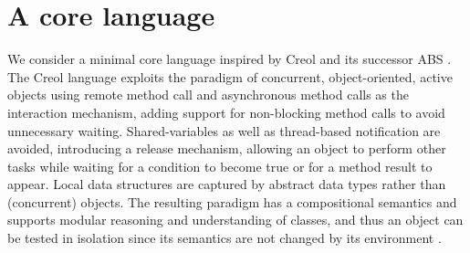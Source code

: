 \documentclass[12pt]{article}%
\begin{document}
\section{A core language}

We consider a minimal core language inspired by Creol and its
successor ABS
\cite{Johnsen04b,johnsen07sosym,Johnsen05d,HATS1.2}. %
The Creol language
exploits the paradigm of concurrent, object-oriented,  active objects
using remote method call and  asynchronous method calls as the interaction
mechanism, adding support for non-blocking method calls to avoid
unnecessary waiting.  Shared-variables as well as 
 thread-based notification are
avoided, introducing a
release mechanism, allowing an object to perform other tasks while
waiting for a condition to become true or for a method result to
appear.  Local data structures are captured by abstract data types
rather than (concurrent) objects.
The resulting paradigm has a compositional semantics  and supports
modular reasoning and understanding of classes, and thus an object can
be tested in isolation since its semantics are not changed by its
environment \cite{Johnsen08,Din12jlap,din12sefm}.


\end{document}
